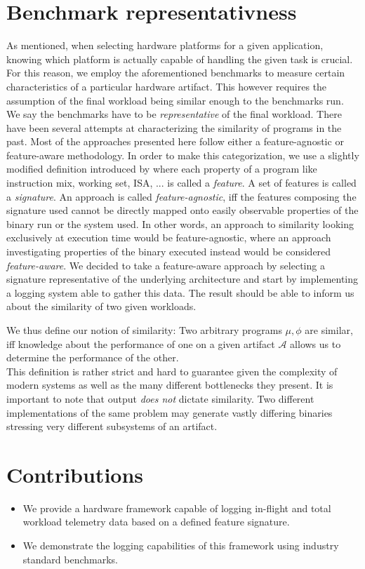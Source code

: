 \documentclass[../bachelor_paper.tex]{subfiles}
\begin{document}
\section{Benchmark representativness}
    \label{sec:prob/repr}
As mentioned, when selecting hardware platforms for a given application, knowing which platform is actually capable of handling the given task is crucial. For this reason, we employ the aforementioned benchmarks to measure certain characteristics of a particular hardware artifact. This however requires the assumption of the final workload being similar enough to the benchmarks run. We say the benchmarks have to be \emph{representative} of the final workload. There have been several attempts at characterizing the similarity of programs in the past. Most of the approaches presented here follow either a feature-agnostic or feature-aware methodology. In order to make this categorization, we use a slightly modified definition introduced by \cite{cammarotaOptimizingProgramPerformance2013} where each property of a program like instruction mix, working set, \ac{ISA}, ... is called a \emph{feature}. A set of features is called a \emph{signature}. An approach is called \emph{feature-agnostic}, iff the features composing the signature used cannot be directly mapped onto easily observable properties of the binary run or the system used. In other words, an approach to similarity looking exclusively at execution time would be feature-agnostic, where an approach investigating properties of the binary executed instead would be considered \emph{feature-aware}. We decided to take a feature-aware approach by selecting a signature representative of the underlying architecture and start by implementing a logging system able to gather this data. The result should be able to inform us about the similarity of two given workloads.

We thus define our notion of similarity: Two arbitrary programs $\mu, \phi$ are similar, iff knowledge about the performance of one on a given artifact $\mathcal{A}$ allows us to determine the performance of the other. \\
This definition is rather strict and hard to guarantee given the complexity of modern systems as well as the many different bottlenecks they present. It is important to note that output \emph{does not} dictate similarity. Two different implementations of the same problem may generate vastly differing binaries stressing very different subsystems of an artifact.


\section{Contributions}
\begin{itemize}
\item We provide a hardware framework capable of logging in-flight and total workload telemetry data based on a defined feature signature.
\item We demonstrate the logging capabilities of this framework using industry standard benchmarks.
\end{itemize}

\isstandalone



\fi
\end{document}
